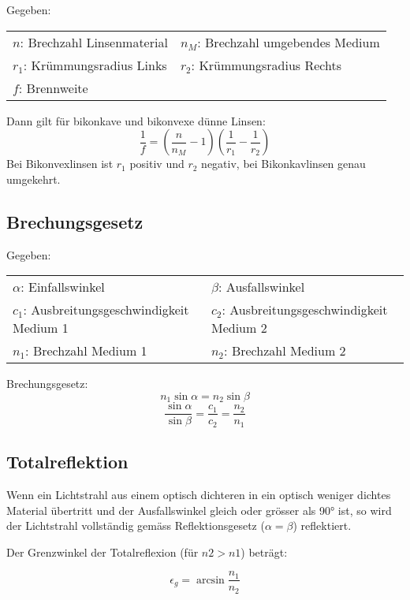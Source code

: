 Gegeben:

\begin{tabular}{ll}
$n$: Brechzahl Linsenmaterial & $n_M$: Brechzahl umgebendes Medium \\
$r_1$: Krümmungsradius Links & $r_2$: Krümmungsradius Rechts \\
$f$: Brennweite & \\
\end{tabular}

Dann gilt für bikonkave und bikonvexe dünne Linsen:
\[
	\frac{1}{f} = \left(\frac{n}{n_M} - 1\right) \left(\frac{1}{r_1} - \frac{1}{r_2}\right)
\]
Bei Bikonvexlinsen ist $r_1$ positiv und $r_2$ negativ, bei Bikonkavlinsen genau
umgekehrt.

\subsection{Brechungsgesetz}

Gegeben:

\begin{tabular}{ll}
	$\alpha$: Einfallswinkel & $\beta$: Ausfallswinkel \\
	$c_1$: Ausbreitungsgeschwindigkeit Medium 1 & $c_2$: Ausbreitungsgeschwindigkeit Medium 2 \\
	$n_1$: Brechzahl Medium 1 & $n_2$: Brechzahl Medium 2
\end{tabular}

Brechungsgesetz:
\[
	n_1 \sin \alpha = n_2 \sin \beta
\]
\[
	\frac{\sin \alpha}{\sin \beta} = \frac{c_1}{c_2} = \frac{n_2}{n_1}
\]

\subsection{Totalreflektion}

Wenn ein Lichtstrahl aus einem optisch dichteren in ein optisch weniger dichtes
Material übertritt und der Ausfallswinkel gleich oder grösser als 90° ist, so
wird der Lichtstrahl vollständig gemäss Reflektionsgesetz ($\alpha = \beta$)
reflektiert.

Der Grenzwinkel der Totalreflexion (für $n2 > n1$) beträgt:

\[
	\epsilon_g = \arcsin{\frac{n_1}{n_2}}
\]

